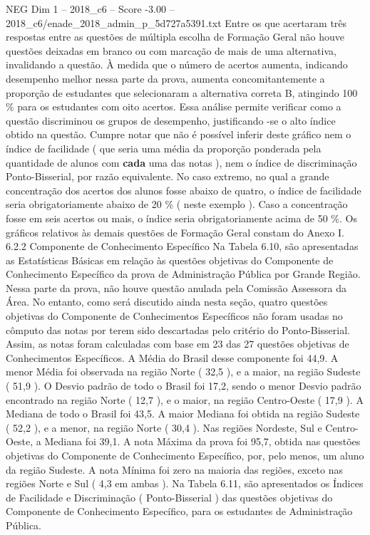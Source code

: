 \begin{textsample}{NEG Dim 1 – 2018\_c6 – Score -3.00 – 2018\_c6/enade\_2018\_admin\_p\_5d727a5391.txt}
Entre os que acertaram três respostas entre as questões de múltipla escolha de Formação Geral não houve questões deixadas em branco ou com marcação de mais de uma alternativa, invalidando a questão.
À medida que o número de acertos aumenta, indicando desempenho melhor nessa parte da prova, aumenta concomitantemente a proporção de estudantes que selecionaram a alternativa correta B, atingindo 100 \% para os estudantes com oito acertos.
Essa análise permite verificar como a questão discriminou os grupos de desempenho, justificando -se o alto índice obtido na questão.
Cumpre notar que não é possível inferir deste gráfico nem o índice de facilidade ( que seria uma média da proporção ponderada pela quantidade de alunos com \textbf{cada} uma das notas ), nem o índice de discriminação Ponto-Bisserial, por razão equivalente.
No caso extremo, no qual a grande concentração dos acertos dos alunos fosse abaixo de quatro, o índice de facilidade seria obrigatoriamente abaixo de 20 \% ( neste exemplo ).
Caso a concentração fosse em seis acertos ou mais, o índice seria obrigatoriamente acima de 50 \%.
Os gráficos relativos às demais questões de Formação Geral constam do Anexo I. 6.2.2 Componente de Conhecimento Específico Na Tabela 6.10, são apresentadas as Estatísticas Básicas em relação às questões objetivas do Componente de Conhecimento Específico da prova de Administração Pública por Grande Região.
Nessa parte da prova, não houve questão anulada pela Comissão Assessora da Área.
No entanto, como será discutido ainda nesta seção, quatro questões objetivas do Componente de Conhecimentos Específicos não foram usadas no cômputo das notas por terem sido descartadas pelo critério do Ponto-Bisserial.
Assim, as notas foram calculadas com base em 23 das 27 questões objetivas de Conhecimentos Específicos.
A Média do Brasil desse componente foi 44,9.
A menor Média foi observada na região Norte ( 32,5 ), e a maior, na região Sudeste ( 51,9 ).
O Desvio padrão de todo o Brasil foi 17,2, sendo o menor Desvio padrão encontrado na região Norte ( 12,7 ), e o maior, na região Centro-Oeste ( 17,9 ).
A Mediana de todo o Brasil foi 43,5.
A maior Mediana foi obtida na região Sudeste ( 52,2 ), e a menor, na região Norte ( 30,4 ).
Nas regiões Nordeste, Sul e Centro-Oeste, a Mediana foi 39,1.
A nota Máxima da prova foi 95,7, obtida nas questões objetivas do Componente de Conhecimento Específico, por, pelo menos, um aluno da região Sudeste.
A nota Mínima foi zero na maioria das regiões, exceto nas regiões Norte e Sul ( 4,3 em ambas ).
Na Tabela 6.11, são apresentados os Índices de Facilidade e Discriminação ( Ponto-Bisserial ) das questões objetivas do Componente de Conhecimento Específico, para os estudantes de Administração Pública.

\end{textsample}
